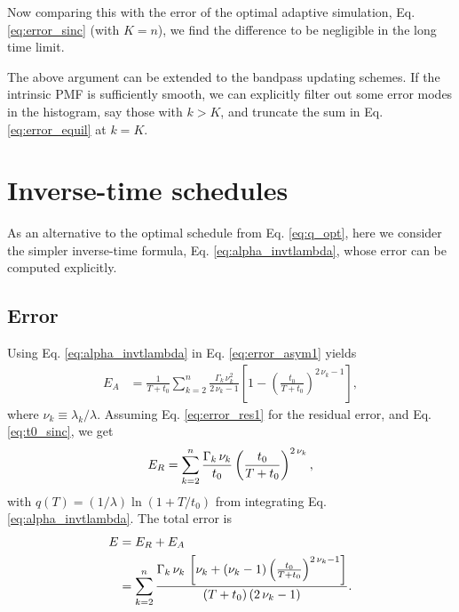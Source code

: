 \documentclass[reprint, floatfix]{revtex4-1}
\newcommand{\Err}{E}
\begin{document}
Now comparing this with the error of
the optimal adaptive simulation,
Eq. \eqref{eq:error_sinc} (with $K = n$),
we find the difference to be negligible
in the long time limit.

The above argument can be extended
to the bandpass updating schemes.
%
If the intrinsic PMF is sufficiently smooth,
we can explicitly filter out some error modes
in the histogram,
say those with $k >  K$,
and truncate the sum in
Eq. \eqref{eq:error_equil} at $k = K$.






\section{\label{sec:invt_schedule}
Inverse-time schedules}



As an alternative to the
optimal schedule from Eq. \eqref{eq:q_opt},
here we consider the simpler
inverse-time formula, Eq. \eqref{eq:alpha_invtlambda},
%
whose error can be computed explicitly.



\subsection{\label{sec:invt_error}
Error
}



Using Eq. \eqref{eq:alpha_invtlambda}
in Eq. \eqref{eq:error_asym1} yields
%
\begin{align}
\Err_A
&=
\frac{    1    }
     { T + t_0 }
\sum_{k = 2}^n
  \frac{ \Gamma_k \, \nu_k^2 }
       {    2 \, \nu_k - 1   }
\left[
  1 - \left(
        \frac {     t_0 }
              { T + t_0 }
      \right)^{ 2 \, \nu_k - 1 }
\right],
\label{eq:error_asym_invt}
\end{align}
%
where $\nu_k \equiv \lambda_k / \lambda$.
%
Assuming Eq. \eqref{eq:error_res1}
for the residual error, and Eq. \eqref{eq:t0_sinc},
we get
%
\begin{equation}
\Err_R
=
\sum_{k = 2}^n
  \frac{ \Gamma_k \, \nu_k }
       {        t_0   }
  \left(
      \frac{   t_0   }
           { T + t_0 }
   \right)^{ 2 \, \nu_k },
\notag
\end{equation}
%
with
$
  q(T)
  =
  ( 1 / \lambda )
  \ln\left(
    1 + T / t_0
  \right)
$
%
from integrating Eq. \eqref{eq:alpha_invtlambda}.
%
%
The total error is
%
\begin{align}
\Err
&=
\Err_R + \Err_A
\notag
\\
&=
\sum_{ k = 2 }^n
  \frac
  {
    \Gamma_k \, \nu_k \,
    \left[
      \nu_k
      +
      (\nu_k - 1)
      \left(
        \frac{ t_0 } { T + t_0 }
      \right)^{ 2 \, \nu_k - 1 }
    \right]
  }
  {
    (T + t_0) \, (2 \, \nu_k - 1)
  }
  .
\label{eq:error_invt}
\end{align}
%
\end{document}
